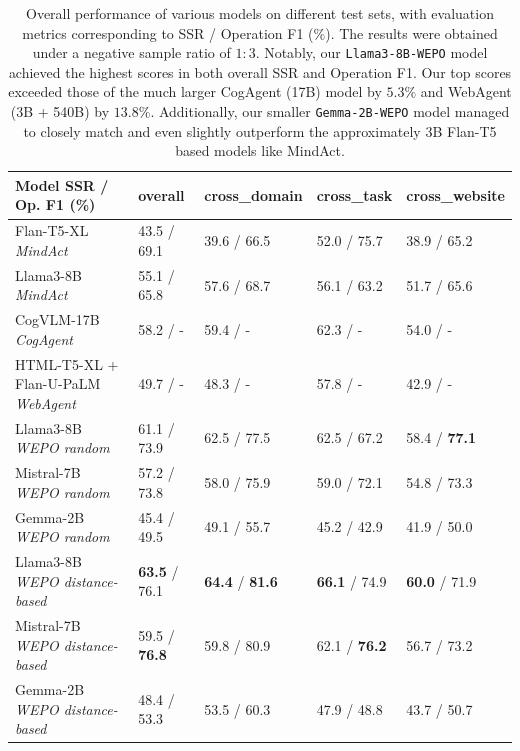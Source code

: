 \documentclass{article}
\begin{document}
  \begin{table}
      \centering
      \begin{tabular}{p{}|p{}p{}p{}p{}}
        \toprule
        \textbf{Model}  SSR / Op. F1 (\%) & \textbf{overall} & \textbf{cross\_domain} & \textbf{cross\_task} & \textbf{cross\_website} \\
        \midrule
        Flan-T5-XL \textit{MindAct} & 43.5 / 69.1 & 39.6 / 66.5 & 52.0 / 75.7 & 38.9 / 65.2 \\
        Llama3-8B \textit{MindAct} & 55.1 / 65.8 & 57.6 / 68.7 & 56.1 / 63.2 & 51.7 / 65.6 \\
        \midrule
        CogVLM-17B \textit{CogAgent} & 58.2 / - & 59.4 / - & 62.3 / - & 54.0 / - \\
        HTML-T5-XL + Flan-U-PaLM \textit{WebAgent} & 49.7 / - & 48.3 / - & 57.8 / - & 42.9 / - \\
        \midrule
        Llama3-8B \textit{WEPO random} & 61.1 / 73.9 & 62.5 / 77.5 & 62.5 / 67.2 & 58.4 / \textbf{77.1} \\
        Mistral-7B \textit{WEPO random} & 57.2 / 73.8 & 58.0 / 75.9 & 59.0 / 72.1 & 54.8 / 73.3 \\
        Gemma-2B \textit{WEPO random} & 45.4 / 49.5 & 49.1 / 55.7 & 45.2 / 42.9 & 41.9 / 50.0 \\
        \midrule
        Llama3-8B \textit{WEPO distance-based} & \textbf{63.5} / 76.1 & \textbf{64.4} / \textbf{81.6} & \textbf{66.1} / 74.9 & \textbf{60.0} / 71.9 \\
        Mistral-7B \textit{WEPO distance-based} & 59.5 / \textbf{76.8} & 59.8 / 80.9 & 62.1 / \textbf{76.2} & 56.7 / 73.2 \\
        Gemma-2B \textit{WEPO distance-based} & 48.4 / 53.3 & 53.5 / 60.3 & 47.9 / 48.8 & 43.7 / 50.7 \\
        \bottomrule
      \end{tabular}
      \caption{\label{model-comparison}
        Overall performance of various models on different test sets, with evaluation metrics corresponding to SSR / Operation F1 (\%). The results were obtained under a negative sample ratio of $1:3$. Notably, our \texttt{Llama3-8B-WEPO} model achieved the highest scores in both overall SSR and Operation F1. Our top scores exceeded those of the much larger CogAgent (17B) model by $5.3\%$ and WebAgent (3B + 540B) by $13.8\%$. Additionally, our smaller \texttt{Gemma-2B-WEPO} model managed to closely match and even slightly outperform the approximately 3B Flan-T5 based models \citep{chung2024scaling} like MindAct.
      }
    \end{table}
  
\end{document}
